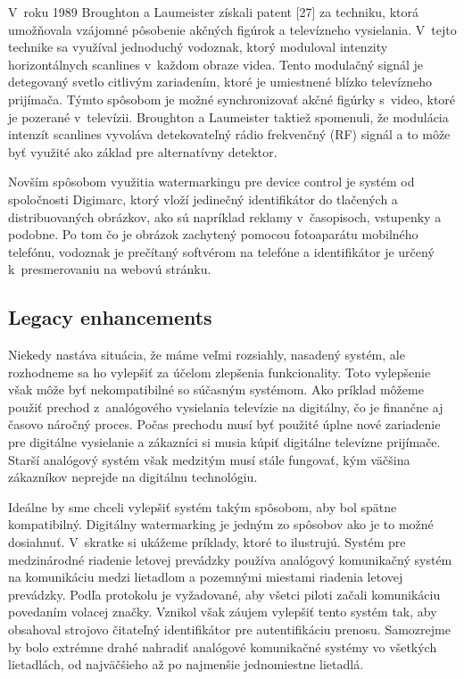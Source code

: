 V~roku 1989 Broughton a Laumeister získali patent [27] za techniku, ktorá umožňovala vzájomné pôsobenie akčných figúrok a televízneho vysielania. V~tejto technike sa využíval jednoduchý vodoznak, ktorý moduloval intenzity horizontálnych scanlines v~každom obraze videa. Tento modulačný signál je detegovaný svetlo citlivým zariadením, ktoré je umiestnené blízko televízneho prijímača. Týmto spôsobom je možné synchronizovať akčné figúrky s~video, ktoré je pozerané v~televízii. Broughton a Laumeister taktiež spomenuli, že modulácia intenzít scanlines vyvoláva detekovateľný rádio frekvenčný (RF) signál a to môže byť využité ako základ pre alternatívny detektor.

Novším spôsobom využitia watermarkingu pre device control je systém od spoločnosti Digimarc, ktorý vloží jedinečný identifikátor do tlačených a distribuovaných obrázkov, ako sú napríklad reklamy v~časopisoch, vstupenky a podobne. Po tom čo je obrázok zachytený pomocou fotoaparátu mobilného telefónu, vodoznak je prečítaný softvérom na telefóne a identifikátor je určený k~presmerovaniu na webovú stránku. \cite{Cox}

\subsection{Legacy enhancements}
Niekedy nastáva situácia, že máme veľmi rozsiahly, nasadený systém, ale rozhodneme sa ho vylepšiť za účelom zlepšenia funkcionality. Toto vylepšenie však môže byť nekompatibilné so súčasným systémom. Ako príklad môžeme použiť prechod z~analógového vysielania televízie na digitálny, čo je finančne aj časovo náročný proces. Počas prechodu musí byť použité úplne nové zariadenie pre digitálne vysielanie a zákazníci si musia kúpiť digitálne televízne prijímače. Starší analógový systém však medzitým musí stále fungovať, kým väčšina zákazníkov neprejde na digitálnu technológiu.

Ideálne by sme chceli vylepšiť systém takým spôsobom, aby bol spätne kompatibilný. Digitálny watermarking je jedným zo spôsobov ako je to možné dosiahnuť. V~skratke si ukážeme príklady, ktoré to ilustrujú.
Systém pre medzinárodné riadenie letovej prevádzky používa analógový komunikačný systém na komunikáciu medzi lietadlom a pozemnými miestami riadenia letovej prevádzky. Podľa protokolu je vyžadované, aby všetci piloti začali komunikáciu povedaním volacej značky. Vznikol však záujem vylepšiť tento systém tak, aby obsahoval strojovo čitateľný identifikátor pre autentifikáciu prenosu. Samozrejme by bolo extrémne drahé nahradiť analógové komunikačné systémy vo všetkých lietadlách, od najväčšieho až po najmenšie jednomiestne lietadlá.


